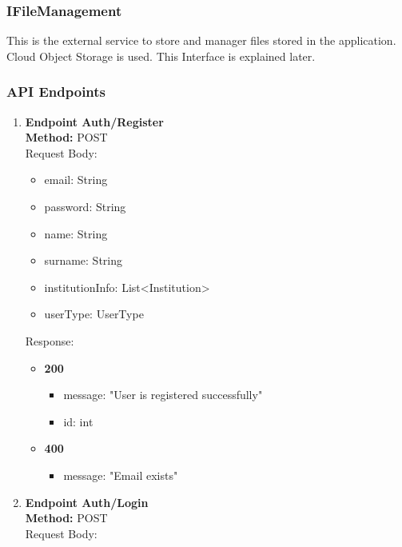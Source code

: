 \subsubsection{IFileManagement}
This is the external service to store and manager files stored in the application. Cloud Object Storage is used. This Interface is explained later.

\subsubsection{API Endpoints}
\begin{enumerate}
    \item \textbf{Endpoint Auth/Register} \\
    \textbf{Method:} POST \\
    Request Body:\\
    \begin{itemize}
        \item email: String
        \item password: String
        \item name: String
        \item surname: String
        \item institutionInfo: List<Institution>
        \item userType: UserType
    \end{itemize}
    Response:\\
    \begin{itemize}
        \item \textbf{200} \\
        \begin{itemize}
            \item message: "User is registered successfully"
            \item id: int
        \end{itemize}
                \item \textbf{400} \\
        \begin{itemize}
            \item message: "Email exists"
        \end{itemize}
    \end{itemize}
    \item \textbf{Endpoint Auth/Login} \\
    \textbf{Method:} POST \\
    Request Body:\\
    \begin{itemize}

\end{itemize}
\end{enumerate}
